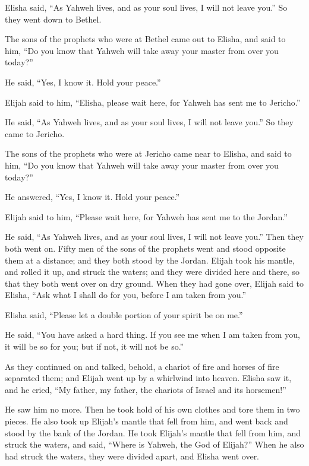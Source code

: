 Elisha said, ``As Yahweh lives, and as your soul lives, I will not leave
you.'' So they went down to Bethel.

 The sons of the prophets who were at Bethel came out to
Elisha, and said to him, ``Do you know that Yahweh will take away your
master from over you today?''

He said, ``Yes, I know it. Hold your peace.''

 Elijah said to him, ``Elisha, please wait here, for
Yahweh has sent me to Jericho.''

He said, ``As Yahweh lives, and as your soul lives, I will not leave
you.'' So they came to Jericho.

 The sons of the prophets who were at Jericho came near to
Elisha, and said to him, ``Do you know that Yahweh will take away your
master from over you today?''

He answered, ``Yes, I know it. Hold your peace.''

 Elijah said to him, ``Please wait here, for Yahweh has
sent me to the Jordan.''

He said, ``As Yahweh lives, and as your soul lives, I will not leave
you.'' Then they both went on.  Fifty men of the sons of
the prophets went and stood opposite them at a distance; and they both
stood by the Jordan.  Elijah took his mantle, and rolled
it up, and struck the waters; and they were divided here and there, so
that they both went over on dry ground.  When they had
gone over, Elijah said to Elisha, ``Ask what I shall do for you, before
I am taken from you.''

Elisha said, ``Please let a double portion of your spirit be on me.''

 He said, ``You have asked a hard thing. If you see me
when I am taken from you, it will be so for you; but if not, it will not
be so.''

 As they continued on and talked, behold, a chariot of
fire and horses of fire separated them; and Elijah went up by a
whirlwind into heaven.  Elisha saw it, and he cried, ``My
father, my father, the chariots of Israel and its horsemen!''

He saw him no more. Then he took hold of his own clothes and tore them
in two pieces.  He also took up Elijah's mantle that fell
from him, and went back and stood by the bank of the Jordan.
 He took Elijah's mantle that fell from him, and struck
the waters, and said, ``Where is Yahweh, the God of Elijah?'' When he
also had struck the waters, they were divided apart, and Elisha went
over.

